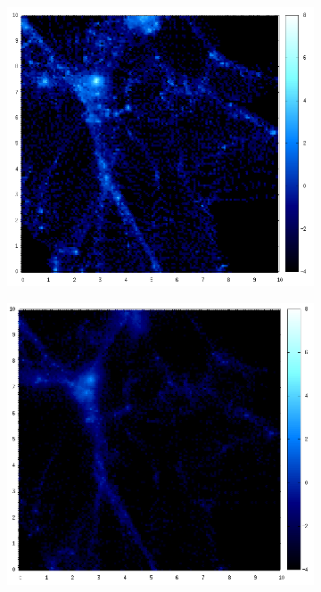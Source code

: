 \documentclass[journal]{IEEEtran}
\begin{document}
\begin{figure}[htb]
\begin{subfigure}[t]{0.25\textwidth}
	\end{subfigure}
	\\
	\begin{subfigure}[t]{0.25\textwidth}
		\centering
		\includegraphics[width=\linewidth]{DM09-10.png}
	\end{subfigure}
	\quad
	\begin{subfigure}[t]{0.25\textwidth}
		\centering
		\includegraphics[width=\linewidth]{GAS09-10.png}

\end{subfigure}
\end{figure}
\end{document}
